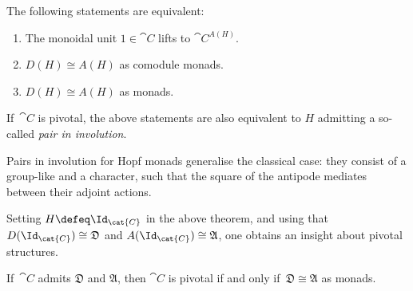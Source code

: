 \documentclass[portrait, noFonts]{betterposter/betterposter}
\begin{document}
{  \begin{highlight}
    The following statements are equivalent:
    \bigskip
    \begin{enumerate}[leftmargin=1em]
      \item The monoidal unit \(1 \in \cat{C}\) lifts to \(\cat{C}^{A(H)}\).
      \item \(D(H) \cong A(H)\) as comodule monads.
      \item \(D(H) \cong A(H)\) as monads.
    \end{enumerate}
    \bigskip
    If\, \(\cat{C}\) is pivotal,
    the above statements are also equivalent to
    \(H\) admitting a so-called \emph{pair in involution}.\\[-1em]
  \end{highlight}

  Pairs in involution for Hopf monads generalise the classical case:
  they consist of a group-like and a character,
  such that the square of the antipode mediates between their adjoint actions.

  \bigskip\bigskip
  Setting \(H \defeq \Id_{\cat{C}}\) in the above theorem,
  and using that \(D(\Id_{\cat{C}}) \cong \mathfrak{D}\) and \(A(\Id_{\cat{C}}) \cong \mathfrak{A}\),
  one obtains an insight about pivotal structures.\\[-0.4em]

  \begin{highlight}
    If\, \(\cat{C}\) admits \(\mathfrak{D}\) and \(\mathfrak{A}\),
    then \(\cat{C}\) is pivotal if and only if\, \(\mathfrak{D} \cong \mathfrak{A}\) as monads.
  \end{highlight}
}
\end{document}
